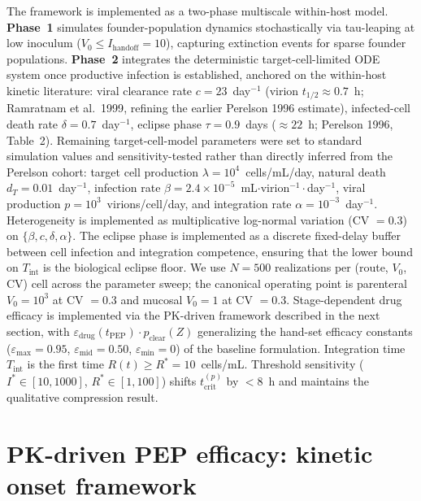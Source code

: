 \documentclass[10pt,letterpaper]{article}
\theoremstyle{definition}
\theoremstyle{remark}
\newcommand{\Tint}{T_{\text{int}}}
\newcommand{\tcrit}{t_{\text{crit}}}
\newcommand{\emax}{\varepsilon_{\max}}
\newcommand{\emid}{\varepsilon_{\text{mid}}}
\newcommand{\emin}{\varepsilon_{\min}}
\begin{document}
The framework is implemented as a two-phase multiscale within-host model. \textbf{Phase~1} simulates founder-population dynamics stochastically via tau-leaping at low inoculum ($V_{0} \leq I_{\text{handoff}} = 10$), capturing extinction events for sparse founder populations. \textbf{Phase~2} integrates the deterministic target-cell-limited ODE system once productive infection is established, anchored on the within-host kinetic literature: viral clearance rate $c = 23$~day$^{-1}$ (virion $t_{1/2} \approx 0.7$~h; Ramratnam et al.\ 1999\cite{ramratnam1999}, refining the earlier Perelson 1996\cite{perelson1996} estimate), infected-cell death rate $\delta = 0.7$~day$^{-1}$\cite{perelson1996}, eclipse phase $\tau = 0.9$~days ($\approx 22$~h; Perelson 1996, Table~2). Remaining target-cell-model parameters were set to standard simulation values and sensitivity-tested rather than directly inferred from the Perelson cohort: target cell production $\lambda = 10^{4}$~cells/mL/day, natural death $d_{T} = 0.01$~day$^{-1}$, infection rate $\beta = 2.4 \times 10^{-5}$~mL$\cdot$virion$^{-1}\cdot$day$^{-1}$, viral production $p = 10^{3}$~virions/cell/day, and integration rate $\alpha = 10^{-3}$~day$^{-1}$.  Heterogeneity is implemented as multiplicative log-normal variation (CV $= 0.3$) on $\{\beta, c, \delta, \alpha\}$. The eclipse phase is implemented as a discrete fixed-delay buffer between cell infection and integration competence, ensuring that the lower bound on $\Tint$ is the biological eclipse floor. We use $N = 500$ realizations per (route, $V_{0}$, CV) cell across the parameter sweep; the canonical operating point is parenteral $V_{0} = 10^{3}$ at CV $= 0.3$ and mucosal $V_{0} = 1$ at CV $= 0.3$. Stage-dependent drug efficacy is implemented via the PK-driven framework described in the next section, with $\varepsilon_{\text{drug}}(t_{\text{PEP}}) \cdot p_{\text{clear}}(Z)$ generalizing the hand-set efficacy constants ($\emax = 0.95$, $\emid = 0.50$, $\emin = 0$) of the baseline formulation. Integration time $\Tint$ is the first time $R(t) \geq R^{*} = 10$~cells/mL. Threshold sensitivity ($I^{*} \in [10, 1000]$, $R^{*} \in [1, 100]$) shifts $\tcrit^{(p)}$ by $<8$~h and maintains the qualitative compression result.


\section*{PK-driven PEP efficacy: kinetic onset framework}
\end{document}
